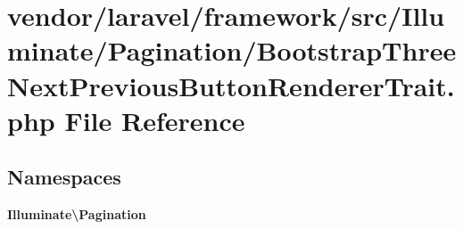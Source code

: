 \section{vendor/laravel/framework/src/\+Illuminate/\+Pagination/\+Bootstrap\+Three\+Next\+Previous\+Button\+Renderer\+Trait.php File Reference}
\label{_bootstrap_three_next_previous_button_renderer_trait_8php}
\subsection*{Namespaces}
\begin{DoxyCompactItemize}
\item 
 {\bf Illuminate\textbackslash{}\+Pagination}
\end{DoxyCompactItemize}
